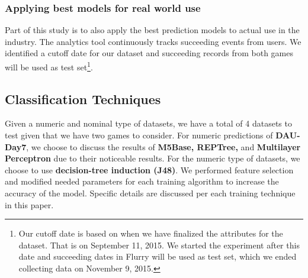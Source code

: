 \subsubsection{Applying best models for real world use}
Part of this study is to also apply the best prediction models to actual use in the industry. The analytics tool continuously tracks succeeding events from users. We identified a cutoff date for our dataset and succeeding records from both games will be used as test set\footnote{Our cutoff date is based on when we have finalized the attributes for the dataset. That is on September 11, 2015. We started the experiment after this date and succeeding dates in Flurry will be used as test set, which we ended collecting data on November 9, 2015.}.

\subsection{Classification Techniques}
Given a numeric and nominal type of datasets, we have a total of 4 datasets to test given that we have two games to consider. For numeric predictions of \textbf{DAU-Day7}, we choose to discuss the results of \textbf{M5Base, REPTree,} and \textbf{Multilayer Perceptron} due to their noticeable results. For the numeric type of datasets, we choose to use \textbf{decision-tree induction (J48)}. We performed feature selection and modified needed parameters for each training algorithm to increase the accuracy of the model. Specific details are discussed per each training technique in this paper.
